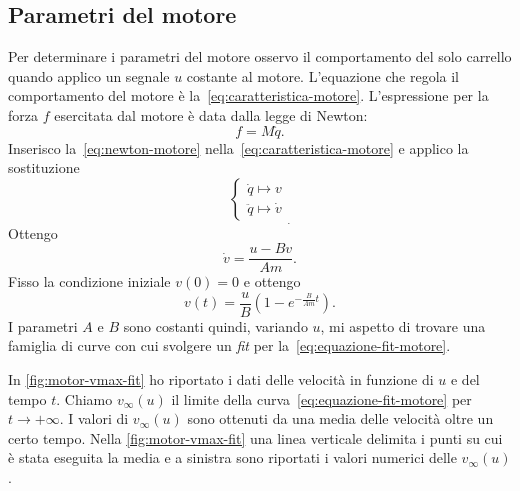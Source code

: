 \subsection{Parametri del motore}
\label{subsec:parametri-motore}
Per determinare i parametri del motore osservo il comportamento del solo
carrello quando applico un segnale $u$ costante al motore.
L'equazione che regola il comportamento del motore è la~\eqref{eq:caratteristica-motore}.
L'espressione per la forza $f$
esercitata dal motore è data dalla legge di Newton:
\begin{equation}
    f = M \ddot q.
    \label{eq:newton-motore}
\end{equation}
Inserisco la~\eqref{eq:newton-motore} nella~\eqref{eq:caratteristica-motore}
e applico la sostituzione
\begin{equation*}
    \left\{
    \begin{aligned}
        \dot q \mapsto v \\
        \ddot q \mapsto \dot v
    \end{aligned}
    \right.
    _.
    \label{eq:sostituzione-motore}
\end{equation*}
Ottengo
\begin{equation*}
    \dot v = \frac{u - B v} {Am}.
\end{equation*}
Fisso la condizione iniziale $v(0) = 0$ e ottengo
\begin{equation}
    v(t) = \frac u B \left(1 - e^{-\frac B {Am} t}\right).
    \label{eq:equazione-fit-motore}
\end{equation}
I parametri $A$ e $B$ sono costanti quindi, variando $u$, mi aspetto di trovare
una famiglia di curve con cui svolgere un \emph{fit} per la~\eqref{eq:equazione-fit-motore}.

In \autoref{fig:motor-vmax-fit} ho riportato i dati delle velocità in funzione di
$u$ e del tempo $t$.
Chiamo $v_\infty(u)$ il limite della
curva~\eqref{eq:equazione-fit-motore} per $t \to +\infty$.
I valori di
$v_\infty(u)$ sono ottenuti da una media delle velocità oltre un certo tempo.
Nella \autoref{fig:motor-vmax-fit} una linea verticale delimita i punti su cui è
stata eseguita la media e a sinistra sono riportati i valori numerici delle $v_\infty(u)$.

